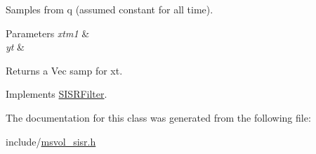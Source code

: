 Samples from q (assumed constant for all time). 


\begin{DoxyParams}{Parameters}
{\em xtm1} & \\
\hline
{\em yt} & \\
\hline
\end{DoxyParams}
\begin{DoxyReturn}{Returns}
a Vec samp for xt. 
\end{DoxyReturn}


Implements \hyperlink{classSISRFilter_a2c480a10cac8b52a36ab1309cf9ea1a4}{S\+I\+S\+R\+Filter}.



The documentation for this class was generated from the following file\+:\begin{DoxyCompactItemize}
\item 
include/\hyperlink{msvol__sisr_8h}{msvol\+\_\+sisr.\+h}\end{DoxyCompactItemize}

